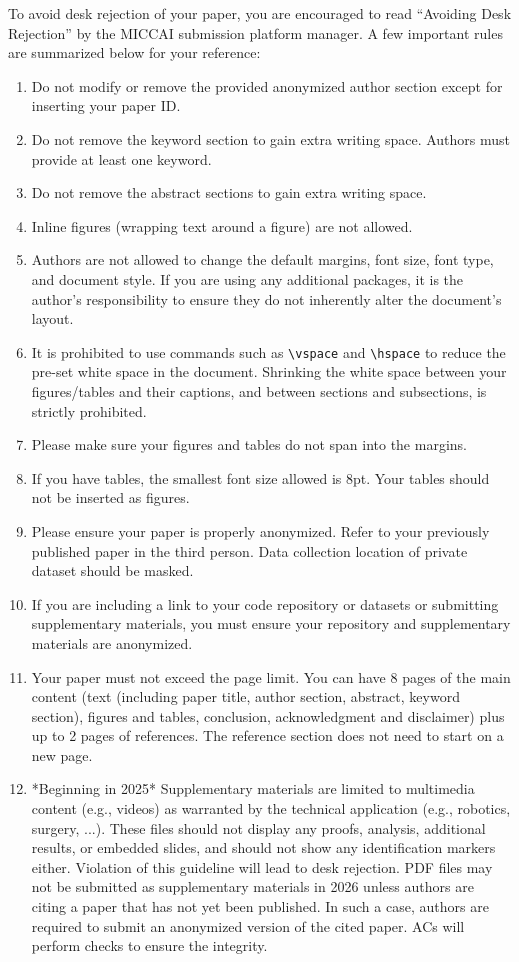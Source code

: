 \documentclass[runningheads]{llncs}
\begin{document}
To avoid desk rejection of your paper, you are encouraged to read ``Avoiding Desk Rejection'' by the MICCAI submission platform manager.  A few important rules are summarized below for your reference:
\begin{enumerate}
    \item Do not modify or remove the provided anonymized author section except for inserting your paper ID.
    \item Do not remove the keyword section to gain extra writing space. Authors must provide at least one keyword.
    \item Do not remove the abstract sections to gain extra writing space.
    \item Inline figures (wrapping text around a figure) are not allowed.
    \item Authors are not allowed to change the default margins, font size, font type, and document style.  If you are using any additional packages, it is the author's responsibility to ensure they do not inherently alter the document's layout.
    \item It is prohibited to use commands such as \verb|\vspace| and \verb|\hspace| to reduce the pre-set white space in the document.  Shrinking the white space between your figures/tables and their captions, and between sections and subsections, is strictly prohibited.
    \item Please make sure your figures and tables do not span into the margins.
    \item If you have tables, the smallest font size allowed is 8pt.  Your tables should not be inserted as figures.
    \item Please ensure your paper is properly anonymized.  Refer to your previously published paper in the third person.  Data collection location of private dataset should be masked.
    \item  If you are including a link to your code repository or datasets or submitting supplementary materials, you must ensure your repository and supplementary materials are anonymized.
    \item Your paper must not exceed the page limit.  You can have 8 pages of the main content (text (including paper title, author section, abstract, keyword section), figures and tables, conclusion, acknowledgment and disclaimer) plus up to 2 pages of references.  The reference section does not need to start on a new page.
    \item *Beginning in 2025*
    Supplementary materials are limited to multimedia content (e.g., videos) as warranted by the technical application (e.g., robotics, surgery, ...). These files should not display any proofs, analysis, additional results, or embedded slides, and should not show any identification markers either. Violation of this guideline will lead to desk rejection. PDF files may not be submitted as supplementary materials in 2026 unless authors are citing a paper that has not yet been published. In such a case, authors are required to submit an anonymized version of the cited paper. ACs will perform checks to ensure the integrity.
\end{enumerate}
\end{document}
